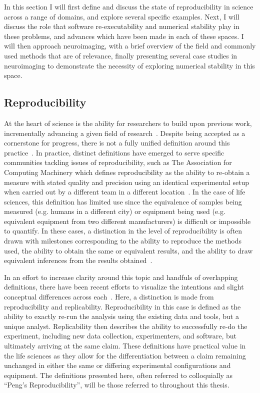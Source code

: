 In this section I will first define and discuss the state of reproducibility in science across a range of domains, and
explore several specific examples. Next, I will discuss the role that software re-executability and numerical stability
play in these problems, and advances which have been made in each of these spaces. I will then approach neuroimaging,
with a brief overview of the field and commonly used methods that are of relevance, finally presenting several case
studies in neuroimaging to demonstrate the necessity of exploring numerical stability in this space.

\subsection{Reproducibility}
At the heart of science is the ability for researchers to build upon previous work, incrementally advancing a given
field of research~\cite{salmon1999introduction,platt1964strong}. Despite being accepted as a cornerstone for progress,
there is not a fully unified definition around this
practice~\cite{plesser2018reproducibility,patil2019visual,goodman2016does}. In practice, distinct definitions have
emerged to serve specific communities tackling issues of reproducibility, such as The Association for Computing
Machinery which defines reproducibility as the ability to re-obtain a measure with stated quality and precision using
an identical experimental setup when carried out by a different team in a different location~\cite{acm_2020}. In the
case of life sciences, this definition has limited use since the equivalence of samples being measured (e.g. humans in
a different city) or equipment being used (e.g. equivalent equipment from two different manufacturers) is difficult or
impossible to quantify. In these cases, a distinction in the level of reproducibility is often drawn with milestones
corresponding to the ability to reproduce the methods used, the ability to obtain the same or equivalent results, and
the ability to draw equivalent inferences from the results obtained~\cite{plesser2018reproducibility}.

In an effort to increase clarity around this topic and handfuls of overlapping definitions, there have been recent
efforts to visualize the intentions and slight conceptual differences across each~\cite{patil2019visual}. Here, a
distinction is made from reproducibility and replicability. Reproducibility in this case is defined as the ability to
exactly re-run the analysis using the existing data and tools, but a unique analyst. Replicability then describes the
ability to successfully re-do the experiment, including new data collection, experimenters, and software, but
ultimately arriving at the same claim. These definitions have practical value in the life sciences as they allow for
the differentiation between a claim remaining unchanged in either the same or differing experimental configurations and
equipment. The definitions presented here, often referred to colloquially as ``Peng's Reproducibility'', will be those
referred to throughout this thesis.

